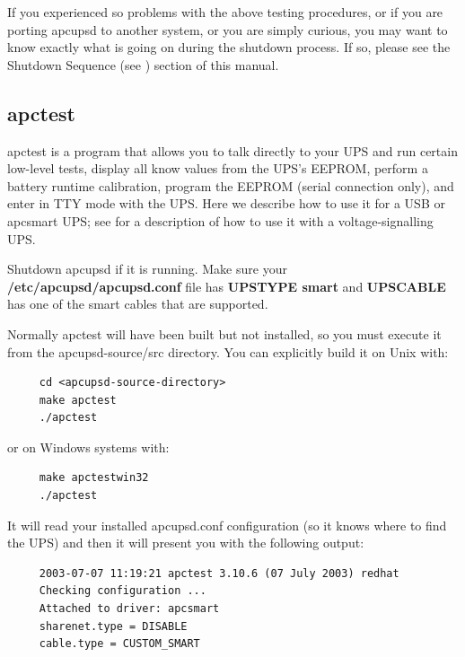 {{{{\label{index-Shutdown-Sequence-99}
If you experienced so problems with the above testing procedures, or if you
are porting apcupsd to another system, or you are simply curious, you may want
to know exactly what is going on during the shutdown process. If so, please
see the Shutdown Sequence (see 
) section of this
manual. 

\label{apctest}

\subsection*{apctest}

\label{index-apctest-100}
apctest is a program that allows you to talk directly to your UPS and run
certain low-level tests, display all know values from the UPS's EEPROM,
perform a battery runtime calibration, program the EEPROM (serial connection
only), and enter in TTY mode with the UPS. Here we describe how to use it for
a USB or apcsmart UPS; see 
 for a description
of how to use it with a voltage-signalling UPS.  

Shutdown apcupsd if it is running. Make sure your {\bf
/etc/apcupsd/apcupsd.conf} file has {\bf UPSTYPE smart} and {\bf UPSCABLE} has
one of the smart cables that are supported.  

Normally apctest will have been built but not installed, so you must execute
it from the \lt{}apcupsd-source\gt{}/src directory. You can explicitly build
it on Unix with: 

\footnotesize
\begin{verbatim}
     cd <apcupsd-source-directory>
     make apctest
     ./apctest
\end{verbatim}
\normalsize

or on Windows systems with: 

\footnotesize
\begin{verbatim}
     make apctestwin32
     ./apctest
\end{verbatim}
\normalsize

It will read your installed apcupsd.conf configuration (so it knows where to
find the UPS) and then it will present you with the following output: 

\footnotesize
\begin{verbatim}
     2003-07-07 11:19:21 apctest 3.10.6 (07 July 2003) redhat
     Checking configuration ...
     Attached to driver: apcsmart
     sharenet.type = DISABLE
     cable.type = CUSTOM_SMART
     

\end{verbatim}}}}}
